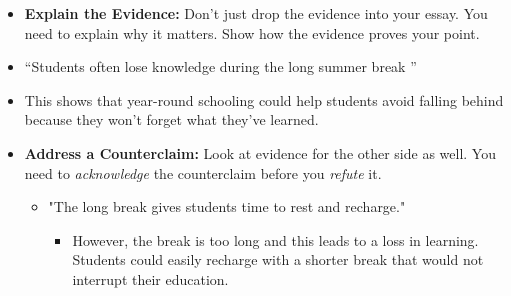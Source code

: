 \documentclass[12pt]{article}
\begin{document}
\begin{tcolorbox}[colframe=black!60, colback=white, 
coltitle=black, colbacktitle=black!15, fonttitle=\bfseries\Large, 
title=Examples, halign title=center, left=10pt, right=10pt, top=10pt, bottom=15pt]
\begin{itemize}
            \item \textbf{Explain the Evidence:} Don’t just drop the evidence into your essay. You need to explain why it matters. Show how the evidence proves your point. 
              \end{itemize}   
            \begin{itemize}
                \begin{itemize}
                    \item      “Students often lose knowledge during the long summer break ”
                \end{itemize}
                    \end{itemize}
                \begin{itemize}
                    \begin{itemize}
                        \begin{itemize}
                            \item This shows that year-round schooling could help students avoid falling behind because they won’t forget what they’ve learned. 
                        \end{itemize}
                    \end{itemize}
                \end{itemize}
\begin{itemize}
    \item \textbf{Address a Counterclaim:} Look at evidence for the other side as well. You need to \textit{acknowledge} the counterclaim before you \textit{refute} it.
    \begin{itemize}
        \item "The long break gives students time to rest and recharge."
        \begin{itemize}
            \item However, the break is too long and this leads to a loss in learning. Students could easily recharge with a shorter break that would not interrupt their education.
        \end{itemize}
    \end{itemize}
\end{itemize}


                      

     






 


     \end{tcolorbox}
\vspace{1em}
\end{document}
